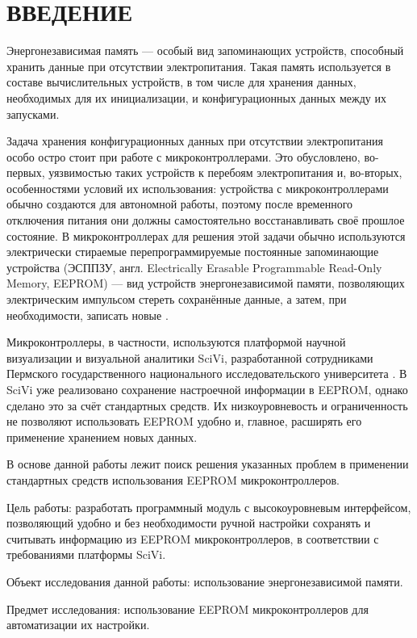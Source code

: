 \chapter*{ВВЕДЕНИЕ}

Энергонезависимая память --- особый вид запоминающих устройств, способный хранить данные при отсутствии электропитания.
Такая память используется в составе вычислительных устройств, в том числе для хранения данных, необходимых для их инициализации, и конфигурационных данных между их запусками.

Задача хранения конфигурационных данных при отсутствии электропитания особо остро стоит при работе с микроконтроллерами.
Это обусловлено, во-первых, уязвимостью таких устройств к перебоям электропитания и, во-вторых, особенностями условий их использования: устройства с микроконтроллерами обычно создаются для автономной работы, поэтому после временного отключения питания они должны самостоятельно восстанавливать своё прошлое состояние.
В микроконтроллерах для решения этой задачи обычно используются электрически стираемые перепрограммируемые постоянные запоминающие устройства (ЭСППЗУ, англ. Electrically Erasable Programmable Read-Only Memory, EEPROM) --- вид устройств энергонезависимой памяти, позволяющих электрическим импульсом стереть сохранённые данные, а затем, при необходимости, записать новые \cite{incollection:eeprom-proposal, article:eeprom}.

Микроконтроллеры, в частности, используются платформой научной визуализации и визуальной аналитики SciVi, разработанной сотрудниками Пермского государственного национального исследовательского университета \cite{article:scivi}.
В SciVi уже реализовано сохранение настроечной информации в EEPROM, однако сделано это за счёт стандартных средств. Их низкоуровневость и ограниченность не позволяют использовать EEPROM удобно и, главное, расширять его применение хранением новых данных.

В основе данной работы лежит поиск решения указанных проблем в применении стандартных средств использования EEPROM микроконтроллеров.

Цель работы: разработать программный модуль с высокоуровневым интерфейсом, позволяющий удобно и без необходимости ручной настройки сохранять и считывать информацию из EEPROM микроконтроллеров, в соответствии с требованиями платформы SciVi.

Объект исследования данной работы: использование энергонезависимой памяти.

Предмет исследования: использование EEPROM микроконтроллеров для автоматизации их настройки.

